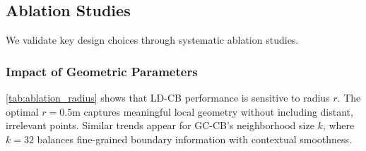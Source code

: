 \documentclass[preprint,12pt]{elsarticle}
\begin{document}
\begin{table}[htbp]
\centering
\caption{Per-class IoU comparison on PSNet12. ResPointNet-LT (Combined Loss) achieves the most consistent improvements, with particularly large gains on challenging tail classes (\texttt{Tee}: +91\% relative; \texttt{Elbow}: +11\% relative over CB+Focal).}
\label{tab:per_class_iou}
\end{table}

\subsection{Ablation Studies}
\label{sec:ablation_studies}
We validate key design choices through systematic ablation studies.

\subsubsection{Impact of Geometric Parameters}
\autoref{tab:ablation_radius} shows that LD-CB performance is sensitive to radius $r$. The optimal $r=0.5$m captures meaningful local geometry without including distant, irrelevant points. Similar trends appear for GC-CB's neighborhood size $k$, where $k=32$ balances fine-grained boundary information with contextual smoothness.
\end{document}
